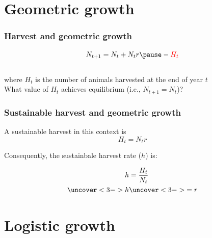 \documentclass[color=usenames,dvipsnames]{beamer}\usepackage[]{graphicx}\usepackage[]{color}
\begin{document}
\section{Geometric growth}




\begin{frame}
  \frametitle{Harvest and geometric growth}
  \Large
  \[
   N_{t+1} = N_t + N_tr \pause - \color{red}{H_t}
  \] \\
  \pause
  \large
  where $H_t$ is the number of animals harvested at the end of
  year $t$ \\
  \pause
  \vfill %
  What value of $H_t$ achieves equilibrium (i.e., $N_{t+1} = N_t$)? \\
\end{frame}




\begin{frame}
  \frametitle{Sustainable harvest and geometric growth}
  \large
  A sustainable harvest in this context is
  \LARGE
  \[
    H_t = N_tr
  \]
  \pause
  \large
  \vfill
  {%
    Consequently, the sustainbale harvest rate ($h$) is: \par}
  \LARGE
  \begin{align*}
    h &= \frac{H_t}{N_t} \\
    \uncover<3->{h}  &\uncover<3->{= r} \\
  \end{align*}
\end{frame}





\section{Logistic growth}


\end{document}
